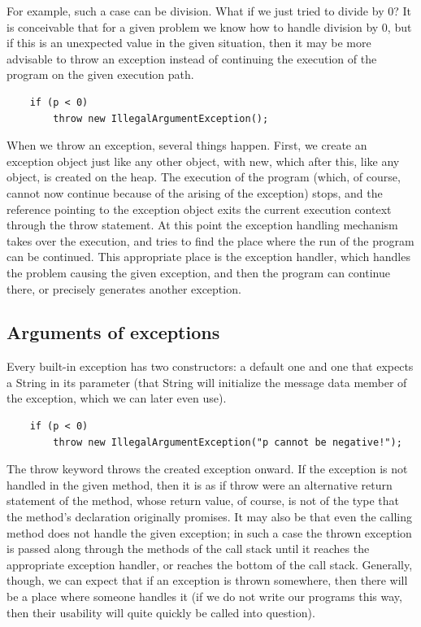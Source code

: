 \documentclass[margin=0px]{article}
\begin{document}
For example, such a case can be division. What if we just tried to divide by 0? It is conceivable that for a given problem we know how to handle division by 0, but if this is an unexpected value in the given situation, then it may be more advisable to throw an exception instead of continuing the execution of the program on the given execution path.

\begin{verbatim}
    if (p < 0)
        throw new IllegalArgumentException();
\end{verbatim}

When we throw an exception, several things happen. First, we create an exception object just like any other object, with new, which after this, like any object, is created on the heap. The execution of the program (which, of course, cannot now continue because of the arising of the exception) stops, and the reference pointing to the exception object exits the current execution context through the throw statement. At this point the exception handling mechanism takes over the execution, and tries to find the place where the run of the program can be continued. This appropriate place is the exception handler, which handles the problem causing the given exception, and then the program can continue there, or precisely generates another exception.

\subsection{Arguments of exceptions}
Every built-in exception has two constructors: a default one and one that expects a String in its parameter (that String will initialize the message data member of the exception, which we can later even use).

\begin{verbatim}
    if (p < 0)
        throw new IllegalArgumentException("p cannot be negative!");
\end{verbatim}

The throw keyword throws the created exception onward. If the exception is not handled in the given method, then it is as if throw were an alternative return statement of the method, whose return value, of course, is not of the type that the method's declaration originally promises. It may also be that even the calling method does not handle the given exception; in such a case the thrown exception is passed along through the methods of the call stack until it reaches the appropriate exception handler, or reaches the bottom of the call stack. Generally, though, we can expect that if an exception is thrown somewhere, then there will be a place where someone handles it (if we do not write our programs this way, then their usability will quite quickly be called into question).
\end{document}
